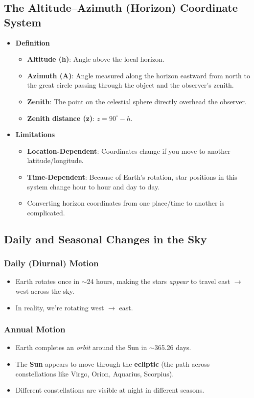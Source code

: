 \subsection{The Altitude--Azimuth (Horizon) Coordinate System}
\begin{itemize}
  \item \textbf{Definition}
  \begin{itemize}
    \item \textbf{Altitude (h)}: Angle above the local horizon.
    \item \textbf{Azimuth (A)}: Angle measured along the horizon eastward from north to the great circle passing through the object and the observer’s zenith.
    \item \textbf{Zenith}: The point on the celestial sphere directly overhead the observer.
    \item \textbf{Zenith distance (z)}: \(z = 90^\circ - h\).
  \end{itemize}
  \item \textbf{Limitations}
  \begin{itemize}
    \item \textbf{Location-Dependent}: Coordinates change if you move to another latitude/longitude.
    \item \textbf{Time-Dependent}: Because of Earth’s rotation, star positions in this system change hour to hour and day to day.
    \item Converting horizon coordinates from one place/time to another is complicated.
  \end{itemize}
\end{itemize}

\subsection{Daily and Seasonal Changes in the Sky}

\subsubsection{Daily (Diurnal) Motion}
\begin{itemize}
  \item Earth rotates once in $\sim$24 hours, making the stars \emph{appear} to travel east $\rightarrow$ west across the sky.
  \item In reality, we’re rotating west $\rightarrow$ east.
\end{itemize}

\subsubsection{Annual Motion}
\begin{itemize}
  \item Earth completes an \emph{orbit} around the Sun in $\sim$365.26 days.
  \item The \textbf{Sun} appears to move through the \textbf{ecliptic} (the path across constellations like Virgo, Orion, Aquarius, Scorpius).
  \item Different constellations are visible at night in different seasons.
\end{itemize}

